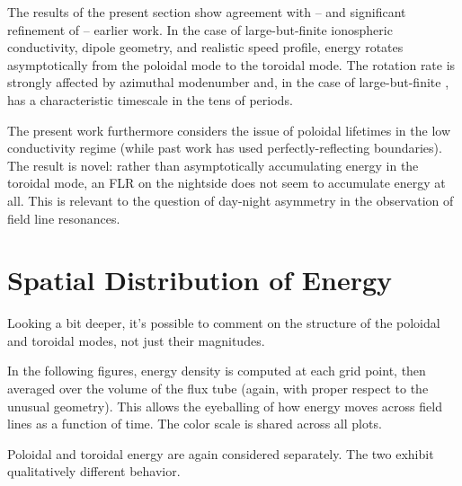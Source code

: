 The results of the present section show agreement with -- and significant refinement of -- earlier work. In the case of large-but-finite ionospheric conductivity, dipole geometry, and realistic \Alfven speed profile, energy rotates asymptotically from the poloidal mode to the toroidal mode. The rotation rate is strongly affected by azimuthal modenumber and, in the case of large-but-finite \azm, has a characteristic timescale in the tens of periods. 

The present work furthermore considers the issue of poloidal lifetimes in the low conductivity regime (while past work has used perfectly-reflecting boundaries). The result is novel: rather than asymptotically accumulating energy in the toroidal mode, an FLR on the nightside does not seem to accumulate energy at all. This is relevant to the question of day-night asymmetry in the observation of field line resonances. 

\section{Spatial Distribution of Energy}
  \label{sec_layers}

Looking a bit deeper, it's possible to comment on the structure of the poloidal and toroidal modes, not just their magnitudes. 


In the following figures, energy density is computed at each grid point, then averaged over the volume of the flux tube (again, with proper respect to the unusual geometry). This allows the eyeballing of how energy moves across field lines as a function of time. The color scale is shared across all plots. 

Poloidal and toroidal energy are again considered separately. The two exhibit qualitatively different behavior. 



